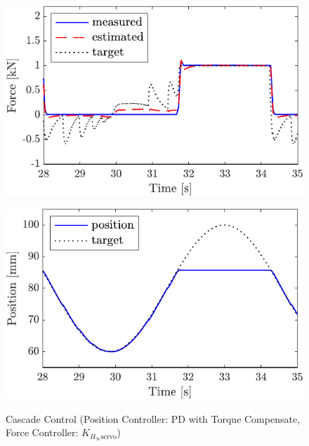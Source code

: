 \begin{figure}[t]
    \begin{minipage}{\minipageratio\hsize}
    \centering
        \includegraphics[keepaspectratio, scale = \minifigscale]{contents/IntegrationControl/figure/SECASQ/crop-FBcsqtch_JFPS4_trq_force.pdf}
        \label{fig5:crop-FBcsqtch_JFPS4_trq_force}
    \end{minipage}
    \begin{minipage}{\minipageratio\hsize}
    \centering
        \includegraphics[keepaspectratio, scale = \minifigscale]{contents/IntegrationControl/figure/SECASQ/crop-FBcsqtch_JFPS4_trq_pos.pdf}
        \label{fig5:crop-FBcsqtch_JFPS4_trq_pos}
    \end{minipage}
    \caption{Cascade Control (Position Controller: PD with Torque Compensate, Force Controller: $K_{H_\infty\mathrm{servo}}$)}  
    \label{fig5:crop-FBcsqtch_JFPS4_trq}
\end{figure}


